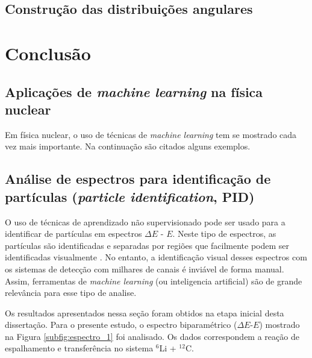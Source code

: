\documentclass[a4paper,12pt,oneside]{book}
\begin{document}
\section{Construção das distribuições angulares}\label{sec:sec_choque}




\chapter{Conclusão}\label{chapter:conclusao}



\begin{appendices}


\chapter{Aplicações de \textit{machine learning} na física nuclear} \label{appendix:ml_nuclear}

\par Em física nuclear, o uso de técnicas de \textit{machine learning} tem se mostrado cada vez mais importante. Na continuação são citados alguns exemplos.

\section{Análise de espectros para identificação de partículas (\textit{particle identification}, PID)}

\par O uso de técnicas de aprendizado não supervisionado pode ser usado para a identificar de partículas em espectros $\Delta E$ - $E$. Neste tipo de espectros, as partículas são identificadas e separadas por regiões que facilmente podem ser identificadas visualmente \cite{DETC_TELE}. No entanto, a identificação visual desses espectros com os sistemas de detecção com milhares de canais é inviável de forma manual. Assim, ferramentas de \textit{machine learning} (ou inteligencia artificial) são de grande relevância para esse tipo de analise.

Os resultados apresentados nessa seção foram obtidos na etapa inicial desta dissertação. Para o presente estudo, o espectro biparamétrico ($\Delta E$-$E$) mostrado na Figura \ref{subfig:espectro_1} foi analisado. Os dados correspondem a reação de espalhamento e transferência no sistema $^{6}$Li +  $^{12}$C.




\end{appendices}
\end{document}
